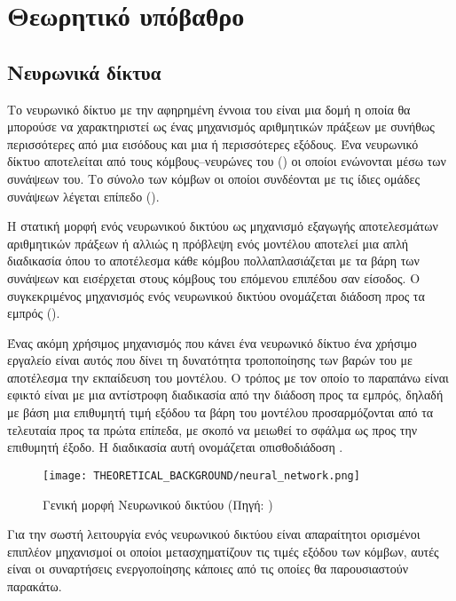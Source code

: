 \chapter{Θεωρητικό υπόβαθρο}
\label{ch:theoreteical_background}

\section{Νευρωνικά δίκτυα}
Το νευρωνικό δίκτυο με την αφηρημένη έννοια του είναι μια δομή η οποία θα μπορούσε να χαρακτηριστεί ως ένας μηχανισμός αριθμητικών πράξεων με συνήθως περισσότερες από μια εισόδους και μια ή περισσότερες εξόδους. Ένα νευρωνικό δίκτυο αποτελείται από τους κόμβους--νευρώνες του () οι οποίοι ενώνονται μέσω των συνάψεων του. Το σύνολο των κόμβων οι οποίοι συνδέονται με τις ίδιες ομάδες συνάψεων λέγεται επίπεδο ().

Η στατική μορφή ενός νευρωνικού δικτύου ως μηχανισμό εξαγωγής αποτελεσμάτων αριθμητικών πράξεων ή αλλιώς η πρόβλεψη ενός μοντέλου αποτελεί μια απλή διαδικασία όπου το αποτέλεσμα κάθε κόμβου πολλαπλασιάζεται με τα βάρη των συνάψεων και εισέρχεται στους κόμβους του επόμενου επιπέδου σαν είσοδος. Ο συγκεκριμένος μηχανισμός ενός νευρωνικού δικτύου ονομάζεται διάδοση προς τα εμπρός ().

Ένας ακόμη χρήσιμος μηχανισμός που κάνει ένα νευρωνικό δίκτυο ένα χρήσιμο εργαλείο είναι αυτός που δίνει τη δυνατότητα τροποποίησης των βαρών του με αποτέλεσμα την εκπαίδευση του μοντέλου. Ο τρόπος με τον οποίο το παραπάνω είναι εφικτό είναι με μια αντίστροφη διαδικασία από την διάδοση προς τα εμπρός, δηλαδή με βάση μια επιθυμητή τιμή εξόδου τα βάρη του μοντέλου προσαρμόζονται από τα τελευταία προς τα πρώτα επίπεδα, με σκοπό να μειωθεί το σφάλμα ως προς την επιθυμητή έξοδο. Η διαδικασία αυτή ονομάζεται οπισθοδιάδοση .

\begin{figure}[H]
  \begin{center}
    \texttt{[image: THEORETICAL\_BACKGROUND/neural\_network.png]}
    \caption{Γενική μορφή Νευρωνικού δικτύου (Πηγή: \href{https://mc.ai/my-notes-on-neural-networks-2/}{})}
  \end{center}
\end{figure}

Για την σωστή λειτουργία ενός νευρωνικού δικτύου είναι απαραίτητοι ορισμένοι επιπλέον μηχανισμοί οι οποίοι μετασχηματίζουν τις τιμές εξόδου των κόμβων, αυτές είναι οι συναρτήσεις ενεργοποίησης κάποιες από τις οποίες θα παρουσιαστούν παρακάτω.

